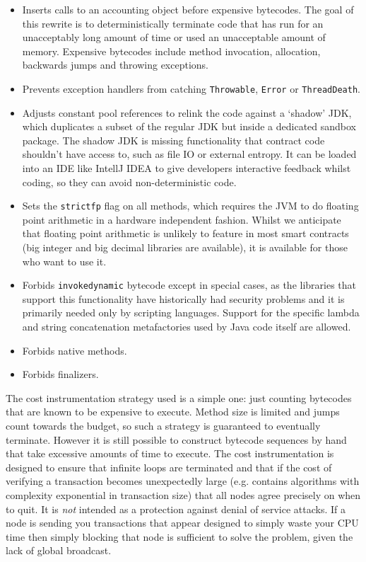 \documentclass{article}
\begin{document}
\begin{itemize}
    \item Inserts calls to an accounting object before expensive bytecodes. The goal of this rewrite is to deterministically
    terminate code that has run for an unacceptably long amount of time or used an unacceptable amount of memory. Expensive
    bytecodes include method invocation, allocation, backwards jumps and throwing exceptions.
    \item Prevents exception handlers from catching \texttt{Throwable}, \texttt{Error} or \texttt{ThreadDeath}.
    \item Adjusts constant pool references to relink the code against a `shadow' JDK, which duplicates a subset of the regular
    JDK but inside a dedicated sandbox package. The shadow JDK is missing functionality that contract code shouldn't have access
    to, such as file IO or external entropy. It can be loaded into an IDE like IntellJ IDEA to give developers interactive
    feedback whilst coding, so they can avoid non-deterministic code.
    \item Sets the \texttt{strictfp} flag on all methods, which requires the JVM to do floating point arithmetic in a hardware
    independent fashion. Whilst we anticipate that floating point arithmetic is unlikely to feature in most smart contracts
    (big integer and big decimal libraries are available), it is available for those who want to use it.
    \item Forbids \texttt{invokedynamic} bytecode except in special cases, as the libraries that support this functionality have
    historically had security problems and it is primarily needed only by scripting languages. Support for the specific
    lambda and string concatenation metafactories used by Java code itself are allowed.
    \item Forbids native methods.
    \item Forbids finalizers.
\end{itemize}

The cost instrumentation strategy used is a simple one: just counting bytecodes that are known to be expensive to
execute. Method size is limited and jumps count towards the budget, so such a strategy is guaranteed to eventually
terminate. However it is still possible to construct bytecode sequences by hand that take excessive amounts of time
to execute. The cost instrumentation is designed to ensure that infinite loops are terminated and that if the cost
of verifying a transaction becomes unexpectedly large (e.g. contains algorithms with complexity exponential in
transaction size) that all nodes agree precisely on when to quit. It is \emph{not} intended as a protection against
denial of service attacks. If a node is sending you transactions that appear designed to simply waste your CPU time
then simply blocking that node is sufficient to solve the problem, given the lack of global broadcast.
\end{document}

